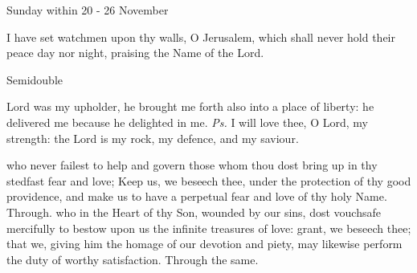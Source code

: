 \begin{multicols}{2}
\begin{inhead}
Sunday within 20 - 26 November
\end{inhead}\par\noindent
I have set watchmen {\dag} upon thy walls, O Jerusalem, which shall never hold their peace day nor night, praising the Name of the Lord.
\end{multicols}


\begin{inhead}
    {Semidouble}
\end{inhead}
\par\noindent
{}



\properantiphonfix


\introit
{} Lord was my upholder, he brought me forth also into a place of liberty: he delivered me because he delighted in me. \textit{Ps.} I will love thee, O Lord, my strength: the Lord is my rock, my defence, and my saviour.

\collect
{} who never failest to help and govern those whom thou dost bring up in thy stedfast fear and love; Keep us, we beseech thee, under the protection of thy good providence, and make us to have a perpetual fear and love of thy holy Name. Through.
 who in the Heart of thy Son, wounded by our sins, dost vouchsafe mercifully to bestow upon us the infinite treasures of love: grant, we beseech thee; that we, giving him the homage of our devotion and piety, may likewise perform the duty of worthy satisfaction. Through the same.

